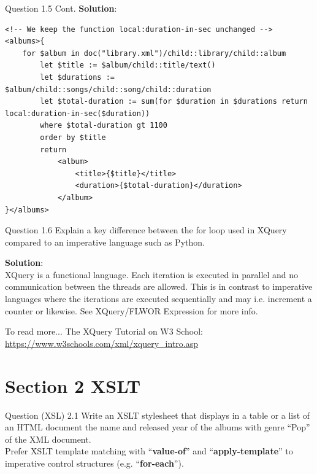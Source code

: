 \begin{frame}[fragile]{Question 1.5 Cont.}
\textbf{Solution}: \\
\begin{lstlisting}[style=xml-small-nomargin]
<!-- We keep the function local:duration-in-sec unchanged -->
<albums>{
	for $album in doc("library.xml")/child::library/child::album
		let $title := $album/child::title/text()
		let $durations := $album/child::songs/child::song/child::duration
		let $total-duration := sum(for $duration in $durations return local:duration-in-sec($duration))
		where $total-duration gt 1100
		order by $title
		return
			<album>
				<title>{$title}</title>
				<duration>{$total-duration}</duration>
			</album>
}</albums>
\end{lstlisting}
\end{frame}


\begin{frame}[fragile]{Question 1.6}
Explain a key difference between the for loop used in XQuery compared to an imperative language such as Python.\\\vspace{10pt}

\textbf{Solution}: \\
XQuery is a functional language. Each iteration is executed in parallel and no communication between the threads are allowed. This is in contrast to imperative languages where the iterations are executed sequentially and may i.e. increment a counter or likewise. See XQuery/FLWOR Expression for more info.

\begin{block}{To read more...}
The XQuery Tutorial on W3 School: \url{https://www.w3schools.com/xml/xquery_intro.asp}
\end{block}	
\end{frame}

\section*{Section 2 XSLT}
\begin{frame}[fragile]{Question (XSL) 2.1}
Write an XSLT stylesheet that displays in a table or a list of an HTML document the name and released year of the albums with genre “Pop” of the XML document.\\\vspace{5pt}
Prefer XSLT template matching with ``\textbf{value-of}'' and ``\textbf{apply-template}'' to imperative control structures (e.g. ``\textbf{for-each}'').\\\vspace{10pt}

\end{frame}

